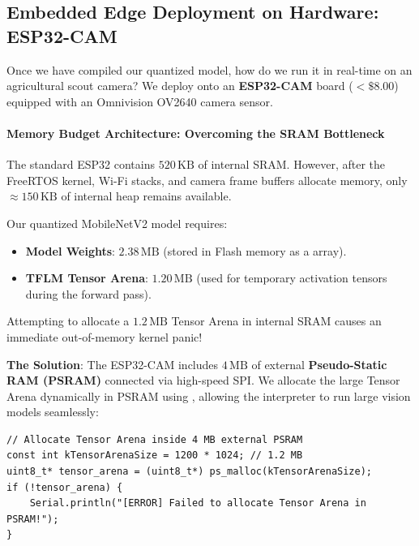 \subsection{Embedded Edge Deployment on Hardware: ESP32-CAM}\label{subsec:p2_hardware}

Once we have compiled our quantized  model, how do we run it in real-time on an agricultural scout camera? We deploy onto an \textbf{ESP32-CAM} board ($<\$8.00$) equipped with an Omnivision OV2640 camera sensor.

\paragraph{Memory Budget Architecture: Overcoming the SRAM Bottleneck}
The standard ESP32 contains $520\,\text{KB}$ of internal SRAM. However, after the FreeRTOS kernel, Wi-Fi stacks, and camera frame buffers allocate memory, only $\approx 150\,\text{KB}$ of internal heap remains available.

Our quantized MobileNetV2 model requires:
\begin{itemize}
    \item \textbf{Model Weights}: $2.38\,\text{MB}$ (stored in Flash memory as a  array).
    \item \textbf{TFLM Tensor Arena}: $1.20\,\text{MB}$ (used for temporary activation tensors during the forward pass).
\end{itemize}
Attempting to allocate a $1.2\,\text{MB}$ Tensor Arena in internal SRAM causes an immediate out-of-memory kernel panic!

\textbf{The Solution}: The ESP32-CAM includes $4\,\text{MB}$ of external \textbf{Pseudo-Static RAM (PSRAM)} connected via high-speed SPI. We allocate the large Tensor Arena dynamically in PSRAM using , allowing the interpreter to run large vision models seamlessly:
\begin{lstlisting}[style=pythonstyle, numbers=none]
// Allocate Tensor Arena inside 4 MB external PSRAM
const int kTensorArenaSize = 1200 * 1024; // 1.2 MB
uint8_t* tensor_arena = (uint8_t*) ps_malloc(kTensorArenaSize);
if (!tensor_arena) {
    Serial.println("[ERROR] Failed to allocate Tensor Arena in PSRAM!");
}
\end{lstlisting}

